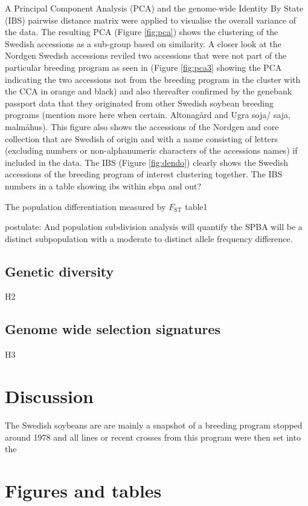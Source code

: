 \documentclass[9pt, onecolumn,twoside]{gsajnl}
\begin{document}
A Principal Component Analysis (PCA) and the genome-wide Identity By State (IBS) pairwise distance matrix were applied to visualise the overall variance of the data. The resulting PCA (Figure \ref{fig:pca}) shows the clustering of the Swedish accessions as a sub-group based on similarity. A closer look at the Nordgen Swedish accessions reviled two accessions that were not part of the particular breeding program as seen in (Figure \ref{fig:pca3}  showing the PCA indicating the two accessions not from the breeding program in the cluster with the CCA in orange and black)  and also thereafter confirmed by the genebank passport data that they originated from other Swedish soybean breeding programs (mention more here when certain. Altonagård and Ugra soja/ saja, malmåhus).  This figure also shows the accessions of the Nordgen and core collection that are Swedish of origin and with a name consisting of letters (excluding numbers or non-alphanumeric characters of the accessions names) if included in the data. 
The IBS (Figure  \ref{fig:dendo}) clearly shows the Swedish accessions of the breeding program of interest clustering together. The  
 IBS numbers in a table showing ibs within sbpa and out?

The population differentiation measured by $F_{\text{ST}}$
table1


postulate: And population subdivision analysis will quantify the SPBA will be a distinct subpopulation with a moderate to distinct allele frequency difference.

\subsection{Genetic diversity} 
H2


\subsection{Genome wide selection signatures} 
H3



\section{Discussion}

The Swedish soybeans are are mainly a snapshot of a breeding program stopped around 1978 and all lines or recent crosses from this program were then set into the  

\section{Figures and tables}
\end{document}
